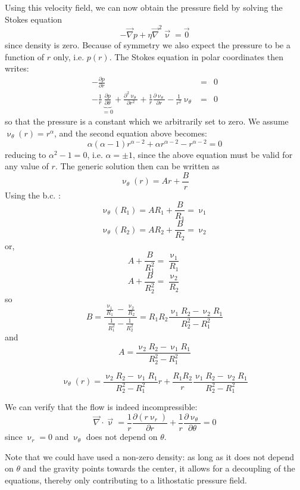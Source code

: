 Using this velocity field, we can now obtain the pressure field 
by solving the Stokes equation
\[
-\vec\nabla p + \eta {\vec\nabla}^2 {\vec \upnu} = {\vec 0}
\]
since density is zero. Because of symmetry we also expect the pressure to
be a function of $r$ only, i.e. $p(r)$.
The Stokes equation in polar coordinates then writes:
\begin{eqnarray}
-\frac{\partial p}{\partial r} &=& 0 \\
-\frac{1}{r}\underbrace{\frac{\partial p}{\partial \theta}}_{=0} + 
\frac{\partial^2 \upnu_\theta}{\partial r^2} + \frac{1}{r} \frac{\partial \upnu_\theta}{\partial r} 
- \frac{1}{r^2} \upnu_\theta  &=&0 
\end{eqnarray}
so that the pressure is a constant which we arbitrarily set to zero. 
We assume $\upnu_\theta(r) = r^\alpha$, and the second equation above becomes: 
\[
\alpha(\alpha-1) r^{\alpha-2}  + \alpha r^{\alpha-2}  - r^{\alpha-2}  = 0 
\]
reducing to $\alpha^2-1=0$, i.e. $\alpha=\pm 1$, since the above equation must be valid
for any value of $r$.
The generic solution then can be written as
\[
\upnu_\theta (r) = A r + \frac{B}{r}
\]
Using the b.c. : 
\[
\upnu_\theta (R_1) = A R_1 + \frac{B}{R_1} = \upnu_1
\]
\[
\upnu_\theta (R_2) = A R_2 + \frac{B}{R_2} = \upnu_2
\]
or, 
\[
A + \frac{B}{R_1^2} = \frac{\upnu_1}{R_1}
\]
\[
A + \frac{B}{R_2^2} = \frac{\upnu_2}{R_2}
\]
so
\[
B=\frac{ \frac{\upnu_1}{R_1}-\frac{\upnu_2}{R_2}  }{\frac{1}{R_1^2} - \frac{1}{R_2^2}} = 
R_1R_2 \frac{ \upnu_1R_2-\upnu_2R_1    }{R_2^2-R_1^2}
\]
and 
\[
A=\frac{\upnu_2R_2-\upnu_1R_1}{R_2^2-R_1^2}
\]


\begin{mdframed}[backgroundcolor=blue!5]
\[
\upnu_\theta (r) = \frac{\upnu_2R_2-\upnu_1R_1}{R_2^2-R_1^2}  r 
+ \frac{R_1R_2}{r} \frac{ \upnu_1R_2-\upnu_2R_1    }{R_2^2-R_1^2}
\]
\end{mdframed}


We can verify that the flow is indeed incompressible:
\[
\vec\nabla\cdot\vec\upnu = \frac{1}{r}\frac{\partial (r\upnu_r)}{\partial r} 
+ \frac{1}{r}\frac{\partial \upnu_\theta}{\partial \theta} = 0
\]
since $\upnu_r=0$ and $\upnu_\theta$ does not depend on $\theta$.

Note that we could have used a non-zero density: as long as it does not 
depend on $\theta$ and the gravity points towards the center,
it allows for a decoupling of the equations, thereby 
only contributing to a lithostatic pressure field.


